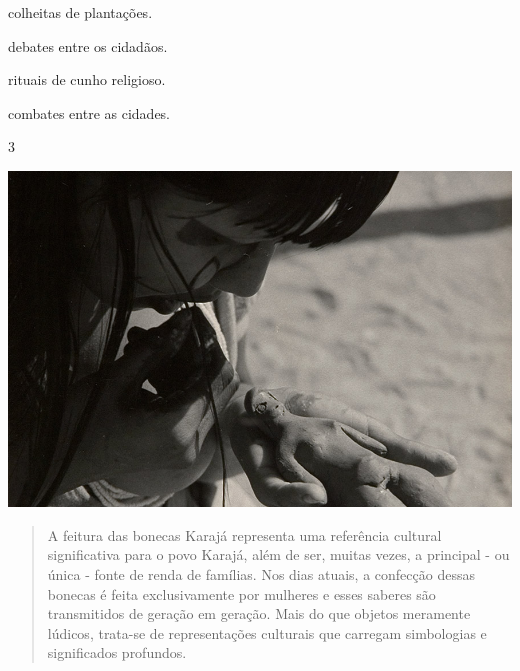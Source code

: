 \begin{minipage}{.5\textwidth}
\begin{escolha}
\item colheitas de plantações.

\item debates entre os cidadãos.

\item rituais de cunho religioso.

\item combates entre as cidades.
\end{escolha}
\end{minipage}

\pagebreak
\num{3}

\begin{minipage}{.5\textwidth}
\includegraphics[width=\textwidth]{./imgs/img44.png}
\end{minipage}\hspace{.5cm}
\begin{minipage}{.5\textwidth}
\begin{quote}
A feitura das bonecas Karajá representa uma referência cultural significativa para o povo Karajá, além de ser, muitas vezes, a principal - ou única - fonte de renda de famílias. Nos dias atuais, a confecção dessas bonecas é feita exclusivamente por mulheres e esses saberes são transmitidos de geração em geração. Mais do que objetos meramente lúdicos, trata-se de representações culturais que carregam simbologias e significados profundos.
\end{quote}
\end{minipage}\bigskip

